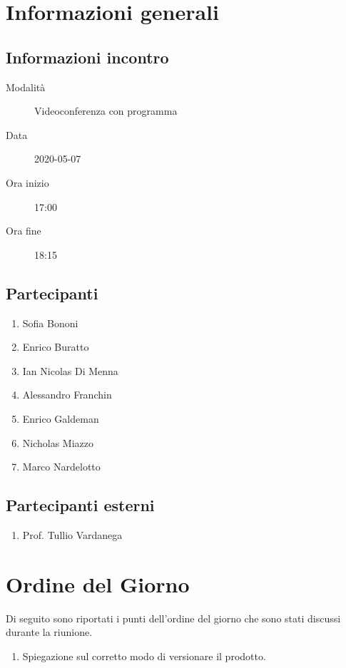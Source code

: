 \documentclass{article}
\begin{document}


\section{Informazioni generali}%
\label{sec:informazioni_generali}

\subsection{Informazioni incontro}%
\label{sub:informazioni_incontro}

\begin{description}
  \item[Modalità] Videoconferenza con programma 
  \item[Data] 2020-05-07
  \item[Ora inizio] 17:00
  \item[Ora fine] 18:15
\end{description}

\subsection{Partecipanti}%
\label{sub:partecipanti}

\begin{enumerate}
  \item Sofia Bononi
  \item Enrico Buratto
  \item Ian Nicolas Di Menna
  \item Alessandro Franchin
  \item Enrico Galdeman
  \item Nicholas Miazzo
  \item Marco Nardelotto
\end{enumerate}

\subsection{Partecipanti esterni}%
\label{sub:partecipanti esterni}

\begin{enumerate}
    \item Prof. Tullio Vardanega
\end{enumerate}


\section{Ordine del Giorno}%
\label{ordine_del_giorno}
Di seguito sono riportati i punti dell'ordine del giorno che sono stati discussi durante la riunione.
\begin{enumerate}
  \item Spiegazione sul corretto modo di versionare il prodotto.
\end{enumerate}
\end{document}
